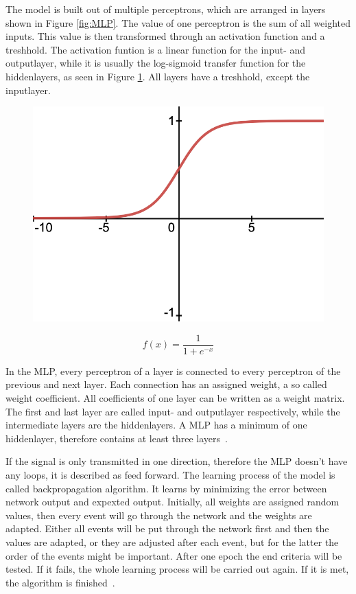 \documentclass[11pt]{scrartcl}
\begin{document}
	The model is built out of multiple perceptrons, which are arranged in layers shown in Figure \ref{fig:MLP}. The value of one perceptron is the sum of all weighted inputs. This value is then transformed through an activation function and a treshhold. The activation funtion is a linear function for the input- and outputlayer, while it is usually the log-sigmoid transfer function for the hiddenlayers, as seen in Figure \ref{fig:log-sigmoid function}. All layers have a treshhold, except the inputlayer. 
	
	\begin{figure}[H]
	\centering
	\begin{minipage}{.5\textwidth}
	  \centering
	  \includegraphics[width=0.5\linewidth]{figures/log-sigmoid.png}
	\end{minipage}%
	\begin{minipage}{.5\textwidth}
	  \centering
		\begin{equation*}
			f(x) = \frac{1}{1 +e^{-x}}
		\end{equation*}
	\end{minipage}
	\label{fig:log-sigmoid function}
	\end{figure}
	
	In the MLP, every perceptron of a layer is connected to every perceptron of the previous and next layer. Each connection has an assigned weight, a so called weight coefficient. All coefficients of one layer can be written as a weight matrix. The first and last layer are called input- and outputlayer respectively, while the intermediate layers are the hiddenlayers. A MLP has a minimum of one hiddenlayer, therefore contains at least three layers~\cite{MLP08}.
	
	If the signal is only transmitted in one direction, therefore the MLP doesn't have any loops, it is described as feed forward. The learning process of the model is called backpropagation algorithm. It learns by minimizing the error between network output and expexted output. Initially, all weights are assigned random values, then every event will go through the network and the weights are adapted. Either all events will be put through the network first and then the values are adapted, or they are adjusted after each event, but for the latter the order of the events might be important. After one epoch the end criteria will be tested. If it fails, the whole learning process will be carried out again. If it is met, the algorithm is finished~\cite{MLP09}.
	
\end{document}
